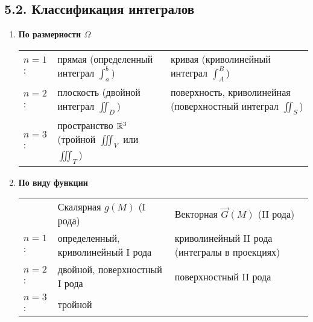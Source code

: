 \documentclass[12pt]{article}
\begin{document}
    \subsection{5.2. Классификация интегралов}

    \begin{enumerate}[label*=\textbf{\arabic**} ]
        \item \textbf{По размерности $\Omega$}

        \begin{tabular}{lp{8cm}p{8cm}}
            $n = 1$: & прямая (определенный интеграл $\int_a^b$)    & кривая (криволинейный интеграл $\int_A^B$)                       \\

            $n = 2$: & плоскость (двойной интеграл $\iint_D$) & поверхность, криволинейная (поверхностный интеграл $\iint_S$) \\

            $n = 3$: & пространство $\mathbb{R}^3$ (тройной $\iiint_V$ или $\iiint_T$) & \\
            

        \end{tabular}

        \item \textbf{По виду функции}

        \begin{tabular}{lp{8cm}p{8cm}}
            & {\centering Скалярная $g(M)$ (I рода)} & {\centering Векторная $\vec{G}(M)$ (II рода)} \\

            $n = 1$: & определенный, криволинейный I рода & криволинейный II рода (интегралы в проекциях) \\

            $n = 2$: & двойной, поверхностный I рода            & поверхностный II рода                          \\

            $n = 3$: & тройной
        \end{tabular}
    \end{enumerate}
\end{document}
